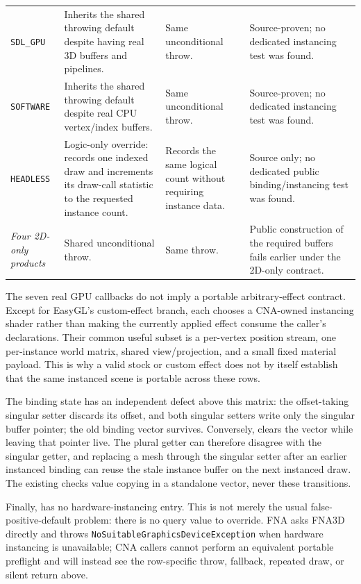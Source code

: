 \begin{longtable}{@{}p{}p{}p{}p{}@{}}
\texttt{SDL\_GPU}
  & Inherits the shared throwing default despite having real 3D buffers and pipelines.
  & Same unconditional throw.
  & Source-proven; no dedicated instancing test was found. \\
\texttt{SOFTWARE}
  & Inherits the shared throwing default despite real CPU vertex/index buffers.
  & Same unconditional throw.
  & Source-proven; no dedicated instancing test was found. \\
\texttt{HEADLESS}
  & Logic-only override: records one indexed draw and increments its draw-call statistic to
    the requested instance count.
  & Records the same logical count without requiring instance data.
  & Source only; no dedicated public binding/instancing test was found. \\
\textit{Four 2D-only products}
  & Shared unconditional throw.
  & Same throw.
  & Public construction of the required buffers fails earlier under the 2D-only contract. \\
\bottomrule
\end{longtable}
\endgroup

The seven real GPU callbacks do not imply a portable arbitrary-effect contract. Except for
EasyGL's custom-effect branch, each chooses a CNA-owned instancing shader rather than making
the currently applied effect consume the caller's declarations. Their common useful subset is
a per-vertex position stream, one per-instance world matrix, shared view/projection, and a
small fixed material payload. This is why a valid stock or custom effect does not by itself
establish that the same instanced scene is portable across these rows.

The binding state has an independent defect above this matrix: the offset-taking singular
setter discards its offset, and both singular setters write only
the singular buffer pointer; the old binding vector survives. Conversely,
 clears the vector while leaving that pointer live. The plural
getter can therefore disagree with the singular getter, and replacing a mesh through the
singular setter after an earlier instanced binding can reuse the stale instance buffer on the
next instanced draw. The existing  checks value copying in
a standalone vector, never these  transitions.

Finally,  has no hardware-instancing entry. This is not merely
the usual false-positive-default problem: there is no query value to override. FNA asks
FNA3D directly and throws \texttt{NoSuitableGraphicsDeviceException} when hardware
instancing is unavailable; CNA callers cannot perform an equivalent portable preflight and
will instead see the row-specific throw, fallback, repeated draw, or silent return above.

